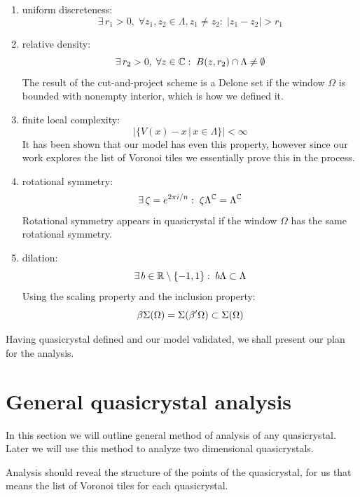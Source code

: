 \documentclass[text.tex]{subfiles}
\begin{document}
\begin{enumerate}
\item uniform discreteness: $$\exists\,r_1>0,\; \forall z_1,z_2\in\Lambda, z_1\neq z_2:\; |z_1-z_2|>r_1$$
\item relative density: $$\exists\,r_2>0,\; \forall z\in\mathbb{C}:\; B(z,r_2)\cap\Lambda \neq \emptyset$$
The result of the cut-and-project scheme is a Delone set if the window $\Omega$ is bounded with nonempty interior, which is how we defined it. 
\item finite local complexity: $$\big|\{V(x)-x\,|\, x\in \Lambda\}\big|<\infty$$
It has been shown that our model has even this property, however since our work explores the list of Voronoi tiles we essentially prove this in the process. 
\item rotational symmetry: $$\exists\,\zeta = e^{2\pi i/n}:\; \zeta\Lambda^{\mathbb{C}} = \Lambda^{\mathbb{C}}$$
Rotational symmetry appears in quasicrystal if the window $\Omega$ has the same rotational symmetry.
\item dilation: $$\exists\,b\in\mathbb{R}\setminus\{-1,1\}:\; b\Lambda\subset \Lambda$$
Using the scaling property and the inclusion property:
$$\beta\Sigma(\Omega) = \Sigma(\beta'\Omega) \subset \Sigma(\Omega)$$
\end{enumerate}

Having quasicrystal defined and  our model validated, we shall present our plan for the analysis. 

\section{General quasicrystal analysis}
In this section we will outline general method of analysis of any quasicrystal. Later we will use this method to analyze two dimensional quasicrystals. 

Analysis should reveal the structure of the points of the quasicrystal, for us that means the list of Voronoi tiles for each quasicrystal. 
\end{document}

